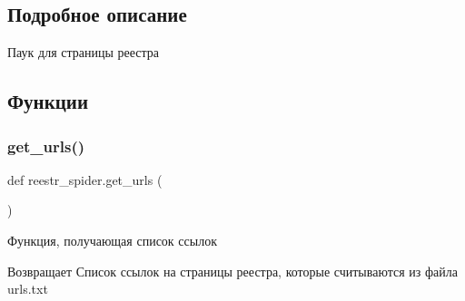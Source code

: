 \subsection{Подробное описание}
Паук для страницы реестра 

\subsection{Функции}
\mbox{\label{namespacereestr__spider_a3ea2fa58027d32fc4f77d612777789fe}} 
\subsubsection{\texorpdfstring{get\+\_\+urls()}{get\_urls()}}
{\footnotesize\ttfamily def reestr\+\_\+spider.\+get\+\_\+urls (\begin{DoxyParamCaption}{ }\end{DoxyParamCaption})}



Функция, получающая список ссылок 

\begin{DoxyReturn}{Возвращает}
Список ссылок на страницы реестра, которые считываются из файла \textquotesingle{}urls.\+txt\textquotesingle{} 
\end{DoxyReturn}
